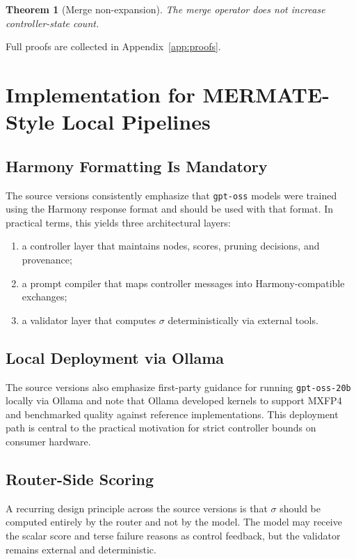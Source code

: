 \documentclass[11pt,a4paper]{article}
\numberwithin{equation}{section}
\newtheorem{theorem}[axiom]{Theorem}
\theoremstyle{definition}
\begin{document}
\begin{theorem}[Merge non-expansion]
The merge operator does not increase controller-state count.
\end{theorem}

Full proofs are collected in Appendix~\ref{app:proofs}.

\section{Implementation for MERMATE-Style Local Pipelines}

\subsection{Harmony Formatting Is Mandatory}

The source versions consistently emphasize that \texttt{gpt-oss} models were trained using the Harmony response format and should be used with that format. In practical terms, this yields three architectural layers:
\begin{enumerate}[leftmargin=2.25em]
    \item a controller layer that maintains nodes, scores, pruning decisions, and provenance;
    \item a prompt compiler that maps controller messages into Harmony-compatible exchanges;
    \item a validator layer that computes \(\sigma\) deterministically via external tools.
\end{enumerate}

\subsection{Local Deployment via Ollama}

The source versions also emphasize first-party guidance for running \texttt{gpt-oss-20b} locally via Ollama and note that Ollama developed kernels to support MXFP4 and benchmarked quality against reference implementations. This deployment path is central to the practical motivation for strict controller bounds on consumer hardware.

\subsection{Router-Side Scoring}

A recurring design principle across the source versions is that \(\sigma\) should be computed entirely by the router and not by the model. The model may receive the scalar score and terse failure reasons as control feedback, but the validator remains external and deterministic.
\end{document}
